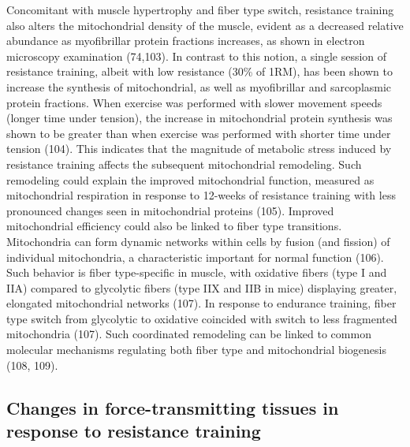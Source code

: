 \documentclass[twoside,10pt]{gihclass} %
\begin{document}
Concomitant with muscle hypertrophy and fiber type switch, resistance training also alters the mitochondrial density of the muscle, evident as a decreased relative abundance as myofibrillar protein fractions increases, as shown in electron microscopy examination
(74,103).
In contrast to this notion, a single session of resistance training, albeit with low resistance (30\% of 1RM), has been shown to increase the synthesis of mitochondrial, as well as myofibrillar and sarcoplasmic protein fractions. When exercise was performed with slower movement speeds (longer time under tension), the increase in mitochondrial protein synthesis was shown to be greater than when exercise was performed with shorter time under tension
(104).
This indicates that the magnitude of metabolic stress induced by resistance training affects the subsequent mitochondrial remodeling.
Such remodeling could explain the improved mitochondrial function, measured as mitochondrial respiration in response to 12-weeks of resistance training with less pronounced changes seen in mitochondrial proteins
(105).
Improved mitochondrial efficiency could also be linked to fiber type transitions.
Mitochondria can form dynamic networks within cells by fusion (and fission) of individual mitochondria, a characteristic important for normal function
(106).
Such behavior is fiber type-specific in muscle, with oxidative fibers (type I and IIA) compared to glycolytic fibers (type IIX and IIB in mice) displaying greater, elongated mitochondrial networks
(107).
In response to endurance training, fiber type switch from glycolytic to oxidative coincided with switch to less fragmented mitochondria
(107).
Such coordinated remodeling can be linked to common molecular mechanisms regulating both fiber type and mitochondrial biogenesis
(108, 109).

\hypertarget{changes-in-force-transmitting-tissues-in-response-to-resistance-training}{%
\subsection{Changes in force-transmitting tissues in response to resistance training}\label{changes-in-force-transmitting-tissues-in-response-to-resistance-training}}
\end{document}
